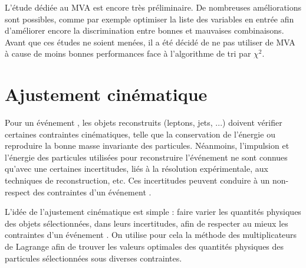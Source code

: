 \bigskip

L'étude dédiée au MVA est encore très préliminaire. De nombreuses améliorations sont possibles, comme par exemple optimiser la liste des variables en entrée afin d'améliorer encore la discrimination entre bonnes et mauvaises combinaisons. Avant que ces études ne soient menées, il a été décidé de ne pas utiliser de MVA à cause de moins bonnes performances face à l'algorithme de tri par $\chi^2$.

\section{Ajustement cinématique}

Pour un événement \ttbar, les objets reconstruits (leptons, jets, ...) doivent vérifier certaines contraintes cinématiques, telle que la conservation de l'énergie ou reproduire la bonne masse invariante des particules. Néanmoins, l'impulsion et l'énergie des particules utilisées pour reconstruire l'événement \ttbar ne sont connues qu'avec une certaines incertitudes, liés à la résolution expérimentale, aux techniques de reconstruction, etc. Ces incertitudes peuvent conduire à un non-respect des contraintes d'un événement \ttbar.

\medskip

L'idée de l'ajustement cinématique est simple : faire varier les quantités physiques des objets sélectionnées, dans leurs incertitudes, afin de respecter au mieux les con\-traintes d'un événement \ttbar. On utilise pour cela la méthode des multiplicateurs de Lagrange afin de trouver les valeurs optimales des quantités physiques des particules sélectionnées sous diverses contraintes.

\bigskip

